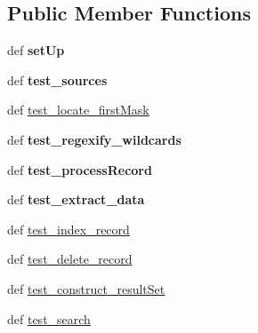 \subsection*{Public Member Functions}
\begin{DoxyCompactItemize}
\item 
\hypertarget{classcheshire3_1_1test_1_1test_index_1_1_simple_index_test_case_aaca9934ae17e3fa8e1a0365b605dd880}{def {\bfseries set\-Up}}\label{classcheshire3_1_1test_1_1test_index_1_1_simple_index_test_case_aaca9934ae17e3fa8e1a0365b605dd880}

\item 
\hypertarget{classcheshire3_1_1test_1_1test_index_1_1_simple_index_test_case_aceb95267e770ea9246695fa88c504669}{def {\bfseries test\-\_\-sources}}\label{classcheshire3_1_1test_1_1test_index_1_1_simple_index_test_case_aceb95267e770ea9246695fa88c504669}

\item 
def \hyperlink{classcheshire3_1_1test_1_1test_index_1_1_simple_index_test_case_a5e4adc6f02ea09d0421f95e79054e91e}{test\-\_\-locate\-\_\-first\-Mask}
\item 
\hypertarget{classcheshire3_1_1test_1_1test_index_1_1_simple_index_test_case_aa7598866f2d5dcad9c2b479f4a965bc1}{def {\bfseries test\-\_\-regexify\-\_\-wildcards}}\label{classcheshire3_1_1test_1_1test_index_1_1_simple_index_test_case_aa7598866f2d5dcad9c2b479f4a965bc1}

\item 
\hypertarget{classcheshire3_1_1test_1_1test_index_1_1_simple_index_test_case_a87cb6382fadfcfbcea112492bb6e55db}{def {\bfseries test\-\_\-process\-Record}}\label{classcheshire3_1_1test_1_1test_index_1_1_simple_index_test_case_a87cb6382fadfcfbcea112492bb6e55db}

\item 
\hypertarget{classcheshire3_1_1test_1_1test_index_1_1_simple_index_test_case_a0211e91ade564bddb4e4e3d1c55cddd3}{def {\bfseries test\-\_\-extract\-\_\-data}}\label{classcheshire3_1_1test_1_1test_index_1_1_simple_index_test_case_a0211e91ade564bddb4e4e3d1c55cddd3}

\item 
def \hyperlink{classcheshire3_1_1test_1_1test_index_1_1_simple_index_test_case_a15ebc52f7b7097707ed5ffb83cad0040}{test\-\_\-index\-\_\-record}
\item 
def \hyperlink{classcheshire3_1_1test_1_1test_index_1_1_simple_index_test_case_aecfca426e85d92474d69ab2dcaf8e669}{test\-\_\-delete\-\_\-record}
\item 
def \hyperlink{classcheshire3_1_1test_1_1test_index_1_1_simple_index_test_case_ad2deb5d901bfacb73cd526c4fd7c6389}{test\-\_\-construct\-\_\-result\-Set}
\item 
def \hyperlink{classcheshire3_1_1test_1_1test_index_1_1_simple_index_test_case_a8aca5510c55cdd2327f6c57f5b4a2b70}{test\-\_\-search}
\end{DoxyCompactItemize}
